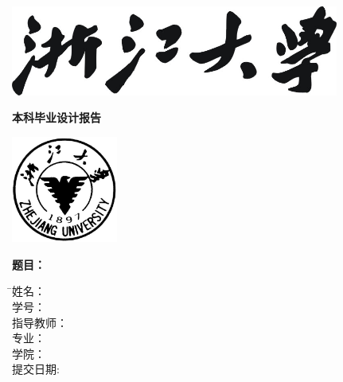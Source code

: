 
\thispagestyle{empty}

\vspace{5mm}

\begin{center}
   \includegraphics[width=108mm]{images/zjdx}
\end{center}

\centerline{\songti\erhao\textbf{本科毕业设计报告}}

\vspace{4mm}

\begin{center}
  \includegraphics[width=35mm]{images/standxb}
\end{center}

\vspace{25mm}

{\hspace{25mm}\songti\sanhao\bfseries 题目：
  \hspace{10mm} \begin{minipage}[t]{98mm}\linespread{1.1}\uline{\zjutitlec}\end{minipage}}

\vspace{7mm}

\begin{tabbing}
    \hspace{30mm} \= \songti\sihao 姓\hspace{10mm}名： \= \underline{\makebox[6cm]{\sihao\zjuauthornamec}} \\[2mm]
    \> \songti\sihao 学\hspace{10mm}号： \> \underline{\makebox[6cm]{\sihao\zjuauthorid}} \\[2mm]
    \> \songti\sihao 指导教师： \> \underline{\makebox[6cm]{\sihao\zjumentorc}} \\[2mm]
    \> \songti\sihao 专\hspace{10mm}业： \> \underline{\makebox[6cm]{\sihao\zjumajorc}} \\[2mm]
    \> \songti\sihao 学\hspace{10mm}院： \> \underline{\makebox[6cm]{\sihao\zjucollegec}} \\[2mm]
    \> \songti\sihao 提交日期: \> \underline{\makebox[6cm]{\sihao\zjusubmitdate}}
\end{tabbing}


